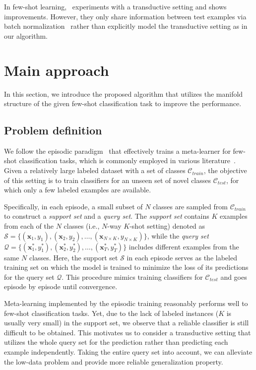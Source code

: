 \documentclass{article} \usepackage{iclr2019_conference,times}
\def\bfx{\mathbf{x}}
\begin{document}
In few-shot learning, \cite{first-order}~experiments with a transductive setting and shows improvements. However, they only share information between test examples via batch normalization~\citep{bn} rather than explicitly model the transductive setting as in our algorithm. 



\section{Main approach}

In this section, we introduce the proposed algorithm that utilizes the manifold
structure of the given few-shot classification task to improve the performance.

\subsection{Problem definition}

We follow the episodic paradigm~\citep{matching} that effectively trains a meta-learner for 
few-shot classification tasks, which is commonly employed in various literature~\citep{prototypical,maml,first-order,compare,snail}. 
Given a relatively large labeled dataset with a set of classes $\mathcal{C}_{train}$,
the objective of this setting is to train classifiers for an unseen set of novel classes $\mathcal{C}_{test}$, for which only a few labeled examples are available. 



Specifically, in each episode, a small subset of $N$ classes are sampled from $\mathcal{C}_{train}$ to construct a \textit{support set} and a \textit{query set}. The \textit{support set} contains $K$ examples from each of the $N$ classes (i.e., $N$-way $K$-shot setting) denoted as $\mathcal{S}=\{(\bfx_1,y_1), (\bfx_2,y_2), \dots, (\bfx_{N\times K}, y_{N\times K})\}$, while the \textit{query set} $\mathcal{Q} = \{(\bfx_1^*,y_1^*), (\bfx_2^*,y_2^*), \dots, (\bfx_T^*, y_T^*)\}$ includes different examples from the same $N$ classes. Here, the support set  $\mathcal{S}$ in each episode serves as the labeled training set on which the model is trained to minimize the loss of its predictions for the query set $\mathcal{Q}$. This procedure mimics training classifiers for $\mathcal{C}_{test}$ and goes episode by episode until convergence. 

Meta-learning implemented by the episodic training reasonably performs well to
few-shot classification tasks. Yet, due to the lack of labeled instances ($K$ is usually very small)
in the support set, we observe that a reliable classifier is still difficult to be obtained. 
This motivates us 
to consider a transductive setting that utilizes the whole query set for the prediction rather than predicting each example independently. Taking the entire query set into account, we can alleviate the low-data problem and provide more reliable generalization property.
\end{document}
